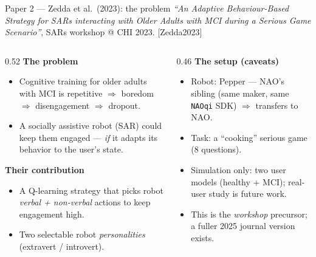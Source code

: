 \documentclass[aspectratio=169,10pt]{beamer}
\newcommand{\refnum}[1]{{\footnotesize\color{giuaccent}[#1]}}
\begin{document}
\begin{frame}{Paper 2 --- Zedda et al.\ (2023): the problem}
  \footnotesize \emph{``An Adaptive Behaviour-Based Strategy for SARs interacting with Older Adults with MCI during a Serious Game Scenario''}, SARs workshop @ CHI 2023. \refnum{Zedda2023}
  \vspace{0.4em}
  \begin{columns}[T]
    \begin{column}{0.52\textwidth}
      \textbf{The problem}
      \begin{itemize}\footnotesize
        \item Cognitive training for older adults with \alert{MCI} is repetitive $\Rightarrow$ boredom $\Rightarrow$ disengagement $\Rightarrow$ dropout.
        \item A socially assistive robot (SAR) could keep them engaged --- \emph{if} it adapts its behavior to the user's state.
      \end{itemize}
      \textbf{Their contribution}
      \begin{itemize}\footnotesize
        \item A \alert{Q-learning} strategy that picks robot \emph{verbal + non-verbal} actions to keep engagement high.
        \item Two selectable robot \emph{personalities} (extravert / introvert).
      \end{itemize}
    \end{column}
    \begin{column}{0.46\textwidth}
      \textbf{The setup (caveats)}
      \begin{itemize}\footnotesize
        \item Robot: \alert{Pepper} --- NAO's sibling (same maker, same \texttt{NAOqi} SDK) $\Rightarrow$ transfers to NAO.
        \item Task: a ``cooking'' serious game (8 questions).
        \item \alert{Simulation only}: two user models (healthy + MCI); real-user study is future work.
        \item This is the \emph{workshop} precursor; a fuller 2025 journal version exists.
      \end{itemize}
    \end{column}
  \end{columns}
\end{frame}
\end{document}
